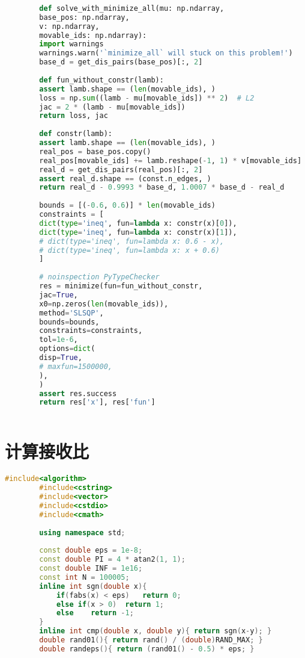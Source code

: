 \documentclass[withoutpreface,bwprint,fontset=macnew]{cumcmthesis} %
\begin{document}
\begin{appendices}
\begin{lstlisting}[language=python]
		
		def solve_with_minimize_all(mu: np.ndarray,
		base_pos: np.ndarray,
		v: np.ndarray,
		movable_ids: np.ndarray):
		import warnings
		warnings.warn('`minimize_all` will stuck on this problem!')
		base_d = get_dis_pairs(base_pos)[:, 2]
		
		def fun_without_constr(lamb):
		assert lamb.shape == (len(movable_ids), )
		loss = np.sum((lamb - mu[movable_ids]) ** 2)  # L2
		jac = 2 * (lamb - mu[movable_ids])
		return loss, jac
		
		def constr(lamb):
		assert lamb.shape == (len(movable_ids), )
		real_pos = base_pos.copy()
		real_pos[movable_ids] += lamb.reshape(-1, 1) * v[movable_ids]
		real_d = get_dis_pairs(real_pos)[:, 2]
		assert real_d.shape == (const.n_edges, )
		return real_d - 0.9993 * base_d, 1.0007 * base_d - real_d
		
		bounds = [(-0.6, 0.6)] * len(movable_ids)
		constraints = [
		dict(type='ineq', fun=lambda x: constr(x)[0]),
		dict(type='ineq', fun=lambda x: constr(x)[1]),
		# dict(type='ineq', fun=lambda x: 0.6 - x),
		# dict(type='ineq', fun=lambda x: x + 0.6)
		]
		
		# noinspection PyTypeChecker
		res = minimize(fun=fun_without_constr,
		jac=True,
		x0=np.zeros(len(movable_ids)),
		method='SLSQP',
		bounds=bounds,
		constraints=constraints,
		tol=1e-6,
		options=dict(
		disp=True,
		# maxfun=1500000,
		),
		)
		assert res.success
		return res['x'], res['fun']
		
	\end{lstlisting}
	
	\section{计算接收比}
	
	\begin{lstlisting}[language=c++]
		#include<algorithm>
		#include<cstring>
		#include<vector>
		#include<cstdio>
		#include<cmath>
		
		using namespace std;
		
		const double eps = 1e-8;
		const double PI = 4 * atan2(1, 1);
		const double INF = 1e16;
		const int N = 100005;
		inline int sgn(double x){
			if(fabs(x) < eps)	return 0;
			else if(x > 0)	return 1;
			else	return -1;
		}
		inline int cmp(double x, double y){ return sgn(x-y); }
		double rand01(){ return rand() / (double)RAND_MAX; }
		double randeps(){ return (rand01() - 0.5) * eps; }
		

\end{lstlisting}
\end{appendices}
\end{document}
